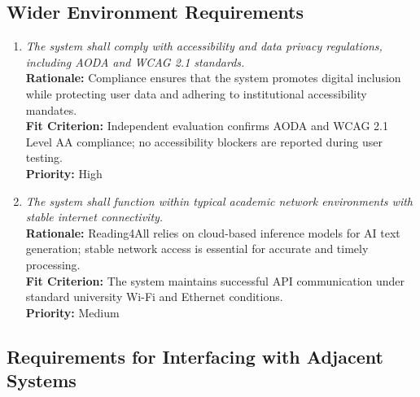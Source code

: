 \documentclass[12pt]{article}
\begin{document}
\subsection{Wider Environment Requirements}

\begin{enumerate}[label=OER-WE\arabic*., wide=0pt, leftmargin=*]
  \item \emph{The system shall comply with accessibility and data privacy regulations, including AODA and WCAG 2.1 standards.}\\[2mm]
    {\bf Rationale:} Compliance ensures that the system promotes digital inclusion while protecting user data and adhering to institutional accessibility mandates.\\
    {\bf Fit Criterion:} Independent evaluation confirms AODA and WCAG 2.1 Level AA compliance; no accessibility blockers are reported during user testing.\\
    {\bf Priority:} High

  \item \emph{The system shall function within typical academic network environments with stable internet connectivity.}\\[2mm]
    {\bf Rationale:} Reading4All relies on cloud-based inference models for AI text generation; stable network access is essential for accurate and timely processing.\\
    {\bf Fit Criterion:} The system maintains successful API communication under standard university Wi-Fi and Ethernet conditions.\\
    {\bf Priority:} Medium
\end{enumerate}

\subsection{Requirements for Interfacing with Adjacent Systems}
\end{document}
